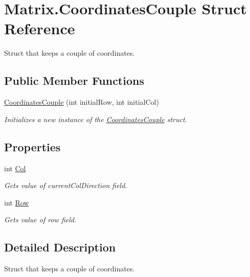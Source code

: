 \hypertarget{struct_matrix_1_1_coordinates_couple}{\section{Matrix.\+Coordinates\+Couple Struct Reference}
\label{struct_matrix_1_1_coordinates_couple}
}


Struct that keeps a couple of coordinates.  


\subsection*{Public Member Functions}
\begin{DoxyCompactItemize}
\item 
\hyperlink{struct_matrix_1_1_coordinates_couple_adcf852429320f08bf43e037c1da10902}{Coordinates\+Couple} (int initial\+Row, int initial\+Col)
\begin{DoxyCompactList}\small\item\em Initializes a new instance of the \hyperlink{struct_matrix_1_1_coordinates_couple}{Coordinates\+Couple} struct. \end{DoxyCompactList}\end{DoxyCompactItemize}
\subsection*{Properties}
\begin{DoxyCompactItemize}
\item 
int \hyperlink{struct_matrix_1_1_coordinates_couple_aaf8547d8f6824a32f9755421165f08e3}{Col}
\begin{DoxyCompactList}\small\item\em Gets value of current\+Col\+Direction field. \end{DoxyCompactList}\item 
int \hyperlink{struct_matrix_1_1_coordinates_couple_a669b16289a1ce293285abfa2f39bd00e}{Row}
\begin{DoxyCompactList}\small\item\em Gets value of row field. \end{DoxyCompactList}\end{DoxyCompactItemize}


\subsection{Detailed Description}
Struct that keeps a couple of coordinates. 



